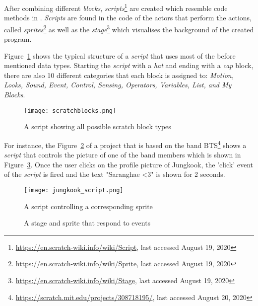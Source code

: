 After combining different \textit{blocks}, \textit{scripts}\footnote{\url{https://en.scratch-wiki.info/wiki/Script}, last accessed August 19, 2020} are created which resemble code methods in \java{}. \textit{Scripts} are found in the code of the actors that perform the actions, called \textit{sprites}\footnote{\url{https://en.scratch-wiki.info/wiki/Sprite}, last accessed August 19, 2020} as well as the \textit{stage}\footnote{\url{https://en.scratch-wiki.info/wiki/Stage}, last accessed August 19, 2020} which visualises the background of the created program. 

Figure~\ref{fig:scratchblocks} shows the typical structure of a \scratch{} \textit{script} that uses most of the before mentioned data types. Starting the \textit{script} with a \textit{hat} and ending with a \textit{cap} block, there are also 10 different categories that each block is assigned to: \textit{Motion, Looks, Sound, Event, Control, Sensing, Operators, Variables, List, and My Blocks}. 

\begin{figure}[t]
    \centering
    \texttt{[image: scratchblocks.png]}
    \caption[All types of scratch blocks]{\label{fig:scratchblocks} A script showing all possible scratch block types}
\end{figure}

For instance, the Figure~\ref{fig:script} of a \scratch{} project that is based on the band BTS\footnote{\url{https://scratch.mit.edu/projects/308718195/}, last accessed August 20, 2020} shows a \textit{script} that controls the picture of one of the band members which is shown in Figure~\ref{fig:sprite}. Once the user clicks on the profile picture of Jungkook, the 'click' event of the \textit{script} is fired and the text "Saranghae <3" is shown for 2 seconds.

\begin{figure}[t]
    \centering
    \texttt{[image: jungkook\_script.png]}
    \caption[Program that controls a sprite]{\label{fig:script} A \scratch{} script controlling a corresponding sprite}
\end{figure}

\begin{figure}[t]
    \centering
    \hfill
    \caption[A sprite's reaction after an executed event]{\label{fig:sprite}A \scratch{} stage and sprite that respond to events}
    \vspace{-1em}
\end{figure}

